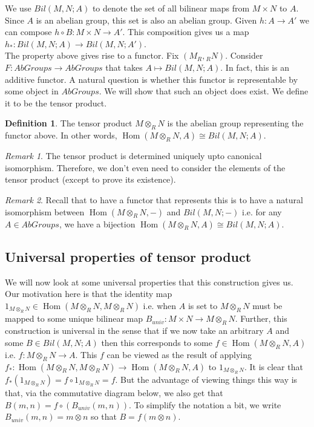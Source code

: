 \documentclass{article}
\newcommand{\tp}[2]{#1 \otimes_R #2}
\DeclareMathOperator{\Hom}{Hom}
\theoremstyle{definition}
\newtheorem{definition}{Definition}[subsection]
\theoremstyle{remark}
\newtheorem*{remark}{Remark}
\theoremstyle{plain}
\begin{document}
We use \(Bil(M,N;A)\) to denote the set of all bilinear maps from \(M \times N\) to \(A\). Since \(A\) is an abelian group,
this set is also an abelian group. Given \(h: A \to A'\) we can compose \(h\circ B: M\times N \to A'\). This composition gives us a map
\(h_{*}: Bil(M,N;A)\to Bil(M,N; A')\). \\

The property above gives rise to a functor. Fix \((M_R, {}_RN)\). Consider \(F: AbGroups \to AbGroups\) that takes \(A \mapsto Bil(M,N;A)\).
In fact, this is an additive functor. A natural question is whether this functor is representable by some object in \(AbGroups\). We will
show that such an object does exist. We define it to be the tensor product. 

\begin{definition}
    The tensor product \(M\otimes_R N\) is the abelian group representing the functor above. In other words, \(\Hom(M\otimes_R N,A) \cong Bil(M,N;A)\). 
\end{definition}

\begin{remark}
    The tensor product is determined uniquely upto canonical isomorphism. Therefore, we don't even need to consider the elements of the tensor product (except to prove its existence).
\end{remark}

\begin{remark}
    Recall that to have a functor that represents this is to have a natural isomorphism between \(\Hom(\tp{M}{N}, -)\) and \(Bil(M,N;-)\) i.e. 
    for any \(A \in AbGroups\), we have a bijection \(\Hom(\tp{M}{N}, A) \cong Bil(M,N;A)\).
\end{remark}

\subsection{Universal properties of tensor product}

We will now look at some universal properties that this construction gives us. Our motivation here is that the identity map \(1_{\tp{M}{N}} \in \Hom(\tp{M}{N}, \tp{M}{N})\) i.e.
when \(A\) is set to \(\tp{M}{N}\) must be mapped to some unique bilinear map \(B_{univ}: M \times N \to \tp{M}{N}\). Further, this construction is universal in the sense that if we now take an arbitrary \(A\) and
some \(B \in Bil(M,N;A)\) then this corresponds to some \(f \in \Hom(\tp{M}{N}, A)\) i.e. \(f: \tp{M}{N} \to A\). This \(f\) can be viewed as the result of applying \(f_*: \Hom(\tp{M}{N}, \tp{M}{N}) \to \Hom(\tp{M}{N}, A)\) to \(1_{\tp{M}{N}}\).
It is clear that \(f_*(1_{\tp{M}{N}}) = f\circ 1_{\tp{M}{N}} = f\). But the advantage of viewing things this way is that, via the commutative diagram below, we also get that \(B(m,n) = f\circ (B_{univ}(m,n))\). To simplify the notation a bit, we 
write \(B_{univ}(m,n) = m \otimes n\) so that \(B = f(m \otimes n)\). 
\end{document}
